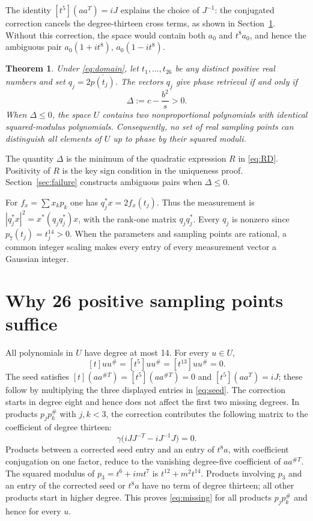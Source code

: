 \documentclass[11pt,a4paper]{article}
\newtheorem{theorem}{Theorem}
\begin{document}
The identity $[t^5](aa^T)=iJ$ explains the choice of $J^{-1}$:
the conjugated correction cancels the degree-thirteen cross terms,
as shown in Section~\ref{sec:sampling}. Without this correction, the space
would contain both $a_0$ and $t^8a_0$, and hence the ambiguous pair
$a_0(1+it^8)$, $a_0(1-it^8)$.

\begin{theorem}\label{thm:main}
Under \eqref{eq:domain}, let $t_1,\ldots,t_{26}$ be any distinct positive real
numbers and set $q_j=2\overline{p(t_j)}$.
The vectors $q_j$ give phase retrieval if and only if
\begin{equation}\label{eq:sharp}
 \Delta:=c-\frac{b^2}{s}>0.
\end{equation}
When $\Delta\le0$, the space $U$ contains two nonproportional polynomials
with identical squared-modulus polynomials. Consequently, no set of real
sampling points can distinguish all elements of $U$ up to phase by their
squared moduli.
\end{theorem}

The quantity $\Delta$ is the minimum of the quadratic expression $R$ in
\eqref{eq:RD}. Positivity of $R$ is the key sign condition in the uniqueness
proof. Section~\ref{sec:failure} constructs ambiguous pairs when
$\Delta\le0$.

For $f_x=\sum x_kp_k$ one has $q_j^*x=2f_x(t_j)$.
Thus the measurement is $|q_j^*x|^2=x^*(q_jq_j^*)x$, with the rank-one
matrix $q_jq_j^*$. Every $q_j$ is nonzero since $p_7(t_j)=t_j^{14}>0$.
When the parameters and sampling points are rational, a common integer
scaling makes every entry of every measurement vector a Gaussian integer.

\section{Why 26 positive sampling points suffice}\label{sec:sampling}
All polynomials in $U$ have degree at most 14. For every $u\in U$,
\begin{equation}\label{eq:missing}
 [t]uu^\#=[t^5]uu^\#=[t^{13}]uu^\#=0.
\end{equation}
The seed satisfies
$[t](aa^{\#T})=[t^5](aa^{\#T})=0$ and $[t^5](aa^T)=iJ$;
these follow by multiplying the three displayed entries in \eqref{eq:seed}.
The correction starts in degree eight and hence does not affect the first
two missing degrees. In products $p_jp_k^\#$ with $j,k<3$, the correction
contributes the following matrix to the coefficient of degree thirteen:
\[
 \gamma\bigl(iJJ^{-T}-iJ^{-1}J\bigr)=0.
\]
Products between a corrected seed entry and an entry of $t^8a$, with
coefficient conjugation on one factor, reduce to the vanishing degree-five
coefficient of $aa^{\#T}$. The squared modulus of $p_3=t^6+imt^7$ is
$t^{12}+m^2t^{14}$. Products involving $p_3$ and an entry of
the corrected seed or $t^8a$ have no term of degree thirteen; all other
products start in higher degree. This proves \eqref{eq:missing}
for all products $p_jp_k^\#$ and hence for every $u$.
\end{document}
